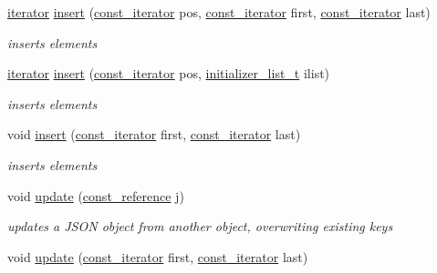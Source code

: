 \begin{DoxyCompactItemize}
\mbox{\hyperlink{classnlohmann_1_1basic__json_a099316232c76c034030a38faa6e34dca}{iterator}} \mbox{\hyperlink{classnlohmann_1_1basic__json_a404cfe1bdbf1dc6b229627fcf2afb95f}{insert}} (\mbox{\hyperlink{classnlohmann_1_1basic__json_a41a70cf9993951836d129bb1c2b3126a}{const\+\_\+iterator}} pos, \mbox{\hyperlink{classnlohmann_1_1basic__json_a41a70cf9993951836d129bb1c2b3126a}{const\+\_\+iterator}} first, \mbox{\hyperlink{classnlohmann_1_1basic__json_a41a70cf9993951836d129bb1c2b3126a}{const\+\_\+iterator}} last)
\begin{DoxyCompactList}\small\item\em inserts elements \end{DoxyCompactList}\item 
\mbox{\hyperlink{classnlohmann_1_1basic__json_a099316232c76c034030a38faa6e34dca}{iterator}} \mbox{\hyperlink{classnlohmann_1_1basic__json_aa19b9b9ca6967295b102f1cc487b1ad7}{insert}} (\mbox{\hyperlink{classnlohmann_1_1basic__json_a41a70cf9993951836d129bb1c2b3126a}{const\+\_\+iterator}} pos, \mbox{\hyperlink{classnlohmann_1_1basic__json_ad70a098fbc01c53497db29d3b5b656a9}{initializer\+\_\+list\+\_\+t}} ilist)
\begin{DoxyCompactList}\small\item\em inserts elements \end{DoxyCompactList}\item 
void \mbox{\hyperlink{classnlohmann_1_1basic__json_a1b0a4e60d56f1fe80501ed941e122892}{insert}} (\mbox{\hyperlink{classnlohmann_1_1basic__json_a41a70cf9993951836d129bb1c2b3126a}{const\+\_\+iterator}} first, \mbox{\hyperlink{classnlohmann_1_1basic__json_a41a70cf9993951836d129bb1c2b3126a}{const\+\_\+iterator}} last)
\begin{DoxyCompactList}\small\item\em inserts elements \end{DoxyCompactList}\item 
void \mbox{\hyperlink{classnlohmann_1_1basic__json_a1cfa9ae5e7c2434cab4cfe69bffffe11}{update}} (\mbox{\hyperlink{classnlohmann_1_1basic__json_a4057c5425f4faacfe39a8046871786ca}{const\+\_\+reference}} j)
\begin{DoxyCompactList}\small\item\em updates a J\+S\+ON object from another object, overwriting existing keys \end{DoxyCompactList}\item 
void \mbox{\hyperlink{classnlohmann_1_1basic__json_a27921dafadb3bbefd180235ec763e3ea}{update}} (\mbox{\hyperlink{classnlohmann_1_1basic__json_a41a70cf9993951836d129bb1c2b3126a}{const\+\_\+iterator}} first, \mbox{\hyperlink{classnlohmann_1_1basic__json_a41a70cf9993951836d129bb1c2b3126a}{const\+\_\+iterator}} last)

\end{DoxyCompactItemize}
